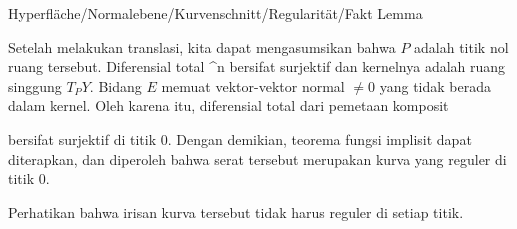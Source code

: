 {Hyperfläche/Normalebene/Kurvenschnitt/Regularität/Fakt}
{Lemma}
{}
{

\faktzusatz {}
\faktzusatz {}

}
{

Setelah melakukan translasi, kita dapat mengasumsikan bahwa $P$ adalah titik nol ruang tersebut. Diferensial total
 {\R^n } {\R
} {}
bersifat surjektif dan kernelnya adalah ruang singgung $T_PY$. Bidang $E$ memuat vektor-vektor normal $\neq 0$ yang tidak berada dalam kernel. Oleh karena itu, diferensial total dari pemetaan komposit

 {  }

bersifat surjektif di titik $0$. Dengan demikian, teorema fungsi implisit dapat diterapkan, dan diperoleh bahwa serat tersebut merupakan kurva yang reguler di titik $0$.

}

Perhatikan bahwa irisan kurva tersebut tidak harus reguler di setiap titik.



